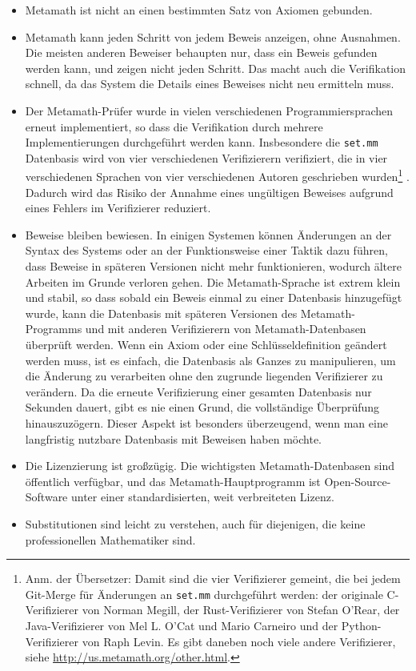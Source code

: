 \begin{itemize}
\item Metamath ist nicht an einen bestimmten Satz von Axiomen gebunden.
\item Metamath kann jeden Schritt von jedem Beweis anzeigen, ohne Ausnahmen.
  Die meisten anderen Beweiser behaupten nur, dass ein Beweis gefunden werden kann, und zeigen nicht jeden Schritt. Das macht auch die Verifikation schnell, da
  das System die Details eines Beweises nicht neu ermitteln muss.
\item Der Metamath-Prüfer wurde in vielen verschiedenen Programmiersprachen erneut implementiert, so dass die Verifikation durch mehrere Implementierungen durchgeführt werden kann.  Insbesondere die
  \texttt{set.mm}%
   Datenbasis wird von
  vier verschiedenen Verifizierern verifiziert, die in vier verschiedenen Sprachen von vier verschiedenen Autoren geschrieben wurden\footnote{Anm. der Übersetzer: Damit sind die vier Verifizierer gemeint, die bei jedem Git-Merge für Änderungen an \texttt{set.mm} durchgeführt werden: der originale C-Verifizierer von Norman Megill, der Rust-Verifizierer von Stefan O'Rear, der Java-Verifizierer von Mel L. O'Cat und Mario Carneiro und der Python-Verifizierer von Raph Levin. Es gibt daneben noch viele andere Verifizierer, siehe \url{http://us.metamath.org/other.html}.} .
  Dadurch wird das Risiko der Annahme eines ungültigen Beweises aufgrund eines Fehlers im Verifizierer reduziert.
\item Beweise bleiben bewiesen.  In einigen Systemen können Änderungen an der Syntax des Systems oder an der Funktionsweise einer Taktik dazu führen, dass Beweise in späteren Versionen nicht mehr funktionieren, wodurch ältere Arbeiten im Grunde verloren gehen.
  Die Metamath-Sprache ist extrem klein und stabil, so dass sobald ein Beweis einmal zu einer Datenbasis hinzugefügt wurde,
  kann die Datenbasis mit späteren Versionen des Metamath-Programms und mit anderen Verifizierern von Metamath-Datenbasen überprüft werden.
  Wenn ein Axiom oder eine Schlüsseldefinition geändert werden muss, ist es einfach, die Datenbasis als Ganzes zu manipulieren, um die Änderung zu verarbeiten ohne den zugrunde liegenden Verifizierer zu verändern.
  Da die erneute Verifizierung einer gesamten Datenbasis nur Sekunden dauert, gibt es nie einen Grund, die vollständige Überprüfung hinauszuzögern.
  Dieser Aspekt ist besonders überzeugend, wenn man eine langfristig nutzbare Datenbasis mit Beweisen haben möchte.
\item Die Lizenzierung ist großzügig.  Die wichtigsten Metamath-Datenbasen sind öffentlich verfügbar, und das Metamath-Hauptprogramm ist Open-Source-Software unter einer standardisierten, weit verbreiteten Lizenz.
\item Substitutionen sind leicht zu verstehen, auch für diejenigen, die keine
  professionellen Mathematiker sind.
\end{itemize}

